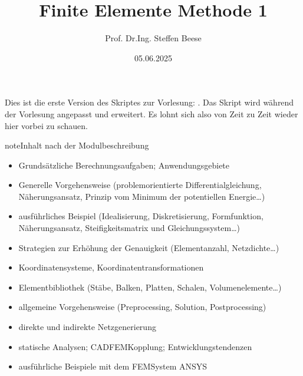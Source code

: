 \documentclass[letterpaper,10pt,german]{jupyterBook}
\title{Finite Elemente Methode 1}
\date{05.06.2025}
\author{Prof.\@{} Dr.\sphinxhyphen{}Ing.\@{} Steffen Beese}
\begin{document}
\pagestyle{empty}
\sphinxmaketitle
\pagestyle{plain}
\sphinxtableofcontents
\pagestyle{normal}
\label{\detokenize{intro::doc}}


\sphinxAtStartPar
Dies ist die erste Version des Skriptes zur Vorlesung: . Das Skript wird während der Vorlesung angepasst und erweitert. Es lohnt sich also von Zeit zu Zeit wieder hier vorbei zu schauen.

\begin{sphinxadmonition}{note}{Inhalt nach der Modulbeschreibung}
\begin{itemize}
\item {} 
\sphinxAtStartPar
Grundsätzliche Berechnungsaufgaben; Anwendungsgebiete

\item {} 
\sphinxAtStartPar
Generelle Vorgehensweise (problemorientierte Differentialgleichung,
Näherungsansatz, Prinzip vom Minimum der potentiellen Energie…)

\item {} 
\sphinxAtStartPar
ausführliches Beispiel (Idealisierung, Diskretisierung, Formfunktion,
Näherungsansatz, Steifigkeitsmatrix und Gleichungssystem…)

\item {} 
\sphinxAtStartPar
Strategien zur Erhöhung der Genauigkeit (Elementanzahl,
Netzdichte…)

\item {} 
\sphinxAtStartPar
Koordinatensysteme, Koordinatentransformationen

\item {} 
\sphinxAtStartPar
Elementbibliothek (Stäbe, Balken, Platten, Schalen,
Volumenelemente…)

\item {} 
\sphinxAtStartPar
allgemeine Vorgehensweise (Preprocessing, Solution, Postprocessing)

\item {} 
\sphinxAtStartPar
direkte und indirekte Netzgenerierung

\item {} 
\sphinxAtStartPar
statische Analysen; CAD\sphinxhyphen{}FEM\sphinxhyphen{}Kopplung; Entwicklungstendenzen

\item {} 
\sphinxAtStartPar
ausführliche Beispiele mit dem FEM\sphinxhyphen{}System ANSYS

\end{itemize}
\end{sphinxadmonition}
\end{document}
